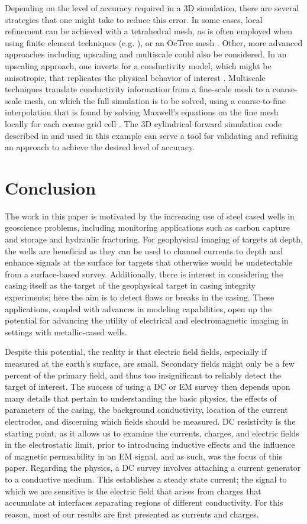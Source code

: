 Depending on the level of accuracy required in a 3D simulation, there are several strategies that one might take to reduce this error. In some cases, local refinement can be achieved with a tetrahedral mesh, as is often employed when using finite element techniques (e.g. \cite{Weiss2016}), or an OcTree mesh \citep{Haber2007}. Other, more advanced approaches including upscaling and multiscale could also be considered. In an upscaling approach, one inverts for a conductivity model, which might be anisotropic, that replicates the physical behavior of interest \citep{Caudillo-Mata2017}. Multiscale techniques translate conductivity information from a fine-scale mesh to a coarse-scale mesh, on which the full simulation is to be solved, using a coarse-to-fine interpolation that is found by solving Maxwell’s equations on the fine mesh locally for each coarse grid cell \citep{Haber2014, Caudillo-Mata2017a}. The 3D cylindrical forward simulation code described in \cite{Heagy2018a} and used in this example can serve a tool for validating and refining an approach to achieve the desired level of accuracy.
\section{Conclusion}
The work in this paper is motivated by the increasing use of steel cased wells in geoscience problems, including monitoring applications such as carbon capture and storage and hydraulic fracturing. For geophysical imaging of targets at depth, the wells are beneficial as they can be used to channel currents to depth and enhance signals at the surface for targets that otherwise would be undetectable from a surface-based survey. Additionally, there is interest in considering the casing itself as the target of the geophysical target in casing integrity experiments; here the aim is to detect flaws or breaks in the casing. These applications, coupled with advances in modeling capabilities, open up the potential for advancing the utility of electrical and electromagnetic imaging in settings with metallic-cased wells.

Despite this potential, the reality is that electric field fields, especially if measured at the earth’s surface, are small. Secondary fields might only be a few percent of the primary field, and thus too insignificant to reliably detect the target of interest. The success of using a DC or EM survey then depends upon many details that pertain to understanding the basic physics, the effects of parameters of the casing, the background conductivity, location of the current electrodes, and discerning which fields should be measured. DC resistivity is the starting point, as it allows us to examine the currents, charges, and electric fields in the electrostatic limit, prior to introducing inductive effects and the influence of magnetic permeability in an EM signal, and as such, was the focus of this paper. Regarding the physics, a DC survey involves attaching a current generator to a conductive medium. This establishes a steady state current; the signal to which we are sensitive is the electric field that arises from charges that accumulate at interfaces separating regions of different conductivity. For this reason, most of our results are first presented as currents and charges.

